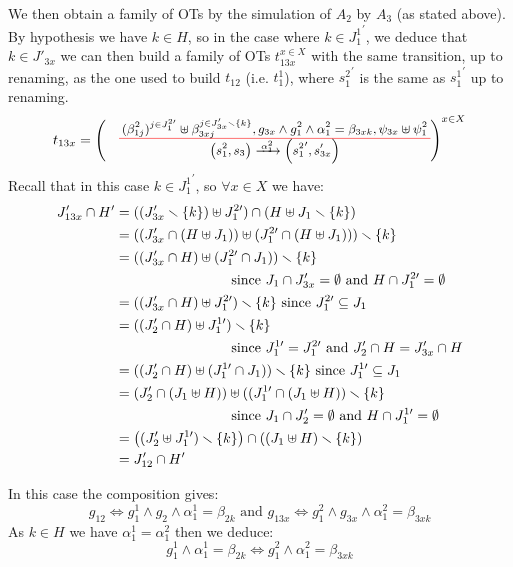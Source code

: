 \documentclass[runningheads]{llncs}
\begin{document}
\begin{enumerate}
We then obtain a family of OTs by the simulation of $A_2$ by $A_3$ (as stated above).
By hypothesis we have $k \in H$, so in the case where $k \in {J^1_{1}}^{\prime}$, we deduce that $k \in J'_{3x}$ we can  then build  a family of OTs $t_{13x}^{x\in X}$ with the same transition, up to renaming, as the one used to build $t_{12}$ (i.e. $t_1^1$), where ${s^2_{1}}^\prime$ is the same as ${s^1_{1}}^\prime$ up to renaming.
\[
t_{13x} = \left(\OT{\mpar{s^2_1, s_3}}{\mpar{{s^2_{1}}',s'_{3x}}}{\alpha^2_{1}}  {{(\beta^2_{1j})^{j \in J^{2 \prime}_1}}\uplus \beta_{3xj}^{j \in J'_{3x}  \setminus \{k\}} }{g_{3x} \wedge g^2_1 \wedge \alpha^2_1 = \beta_{3xk}}{\psi_{3x} \uplus \psi^2_1}
\right)^{x\in X}\]
Recall that in this case  $k \in {J^1_{1}}^{\prime}$, so $\forall x \in X$ we have:
\begin{align*}
  J'_{13x} \cap H'  
&=((J'_{3x}  \smallsetminus {\left\{k\right\}})\uplus J^{2 \prime}_{1} ) \cap (H\uplus J_1 \smallsetminus\{k\} )\\
&=((J'_{3x}\cap (H\uplus J_1))\uplus (J^{2 \prime}_{1}\cap (H\uplus J_1)))\smallsetminus {\left\{k\right\}}\\
&=((J'_{3x}\cap H)\uplus (J^{2 \prime}_{1}\cap  J_1))\smallsetminus {\left\{k\right\}}\\
& \qquad\qquad\qquad\qquad\text{ since } J_1\cap J'_{3x} = \emptyset \text{ and } H\cap J^{2 \prime}_{1} = \emptyset\\
& =((J'_{3x}\cap H)\uplus J^{2 \prime}_{1})\smallsetminus {\left\{k\right\}}\text{ since } J^{2 \prime}_{1}\subseteq J_1\\
& =((J'_2\cap H)\uplus J^{1 \prime}_{1})\smallsetminus {\left\{k\right\}}\\
& \qquad\qquad\qquad\qquad \text{ since } J^{1 \prime}_{1}=J^{2 \prime}_{1} \text{ and } J'_2 \cap H = J'_{3x} \cap H\\
&= ((J'_2 \cap H) \uplus (J^{1 \prime}_{1} \cap J_1)) \smallsetminus {\left\{k\right\}}\text{ since } J^{1 \prime}_{1}\subseteq J_1\\ 
& = (J'_2\cap (J_1 \uplus H)) \uplus ((J^{1 \prime}_{1} \cap (J_1 \uplus H)) \smallsetminus {\left\{k\right\}}\\
& \qquad\qquad\qquad\qquad \text{ since } J_1\cap J'_{2} = \emptyset \text{ and } H\cap J^{1 \prime}_{1} = \emptyset\\
		& = {\left((J'_2  \uplus J^{1 \prime}_{1})\smallsetminus {\left\{k\right\}}\right)} \cap {\left((J_{1} \uplus H) \smallsetminus{\left\{k\right\}}\right)}\\
		& = J'_{12} \cap H'
\end{align*}	

In this case the composition gives: \[g_{12} \Leftrightarrow g^1_1 \wedge g_2 \wedge \alpha^1_1=\beta_{2k} \text{ and }
g_{13x}  \Leftrightarrow g^2_1 \wedge g_{3x} \wedge  \alpha^2_1=\beta_{3xk}\]
As $k \in H$ we have   
$\alpha^1_1= \alpha^2_1$ then we  deduce:
\[g^1_1 \wedge \alpha^1_1=\beta_{2k}  \Leftrightarrow g^2_1 \wedge \alpha^2_1= \beta_{3xk}\]




\end{enumerate}
\end{document}
